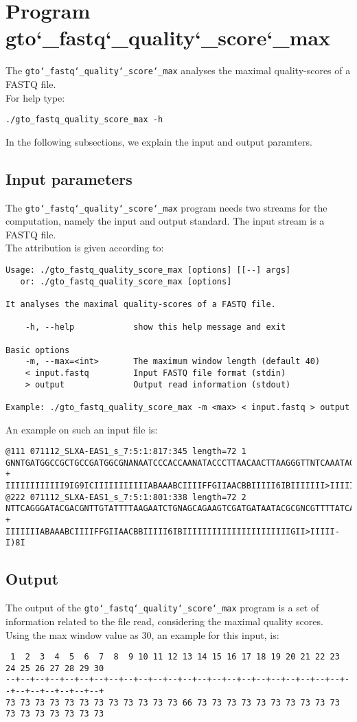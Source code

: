 \section{Program gto\char`_fastq\char`_quality\char`_score\char`_max}
The \texttt{gto\char`_fastq\char`_quality\char`_score\char`_max} analyses the maximal quality-scores of a FASTQ file.\\
For help type:
\begin{lstlisting}
./gto_fastq_quality_score_max -h
\end{lstlisting}
In the following subsections, we explain the input and output paramters.

\subsection*{Input parameters}

The \texttt{gto\char`_fastq\char`_quality\char`_score\char`_max} program needs two streams for the computation, namely the input and output standard. The input stream is a FASTQ file.\\
The attribution is given according to:
\begin{lstlisting}
Usage: ./gto_fastq_quality_score_max [options] [[--] args]
   or: ./gto_fastq_quality_score_max [options]

It analyses the maximal quality-scores of a FASTQ file.

    -h, --help            show this help message and exit

Basic options
    -m, --max=<int>       The maximum window length (default 40)
    < input.fastq         Input FASTQ file format (stdin)
    > output              Output read information (stdout)

Example: ./gto_fastq_quality_score_max -m <max> < input.fastq > output
\end{lstlisting}
An example on such an input file is:
\begin{lstlisting}
@111 071112_SLXA-EAS1_s_7:5:1:817:345 length=72 1
GNNTGATGGCCGCTGCCGATGGCGNANAATCCCACCAANATACCCTTAACAACTTAAGGGTTNTCAAATAGA
+
IIIIIIIIIIII9IG9ICIIIIIIIIIIIABAAABCIIIIFFGIIAACBBIIIII6IBIIIIIII>IIIIII/
@222 071112_SLXA-EAS1_s_7:5:1:801:338 length=72 2
NTTCAGGGATACGACGNTTGTATTTTAAGAATCTGNAGCAGAAGTCGATGATAATACGCGNCGTTTTATCAN
+
IIIIIIIABAAABCIIIIFFGIIAACBBIIIII6IBIIIIIIIIIIIIIIIIIIIIIIGII>IIIII-I)8I
\end{lstlisting}

\subsection*{Output}
The output of the \texttt{gto\char`_fastq\char`_quality\char`_score\char`_max} program is a set of information related to the file read, considering the maximal quality scores.  \\
Using the max window value as 30, an example for this input, is: 
\begin{lstlisting}
 1  2  3  4  5  6  7  8  9 10 11 12 13 14 15 16 17 18 19 20 21 22 23 24 25 26 27 28 29 30 
--+--+--+--+--+--+--+--+--+--+--+--+--+--+--+--+--+--+--+--+--+--+--+--+--+--+--+--+--+--+
73 73 73 73 73 73 73 73 73 73 73 73 66 73 73 73 73 73 73 73 73 73 73 73 73 73 73 73 73 73 
\end{lstlisting}